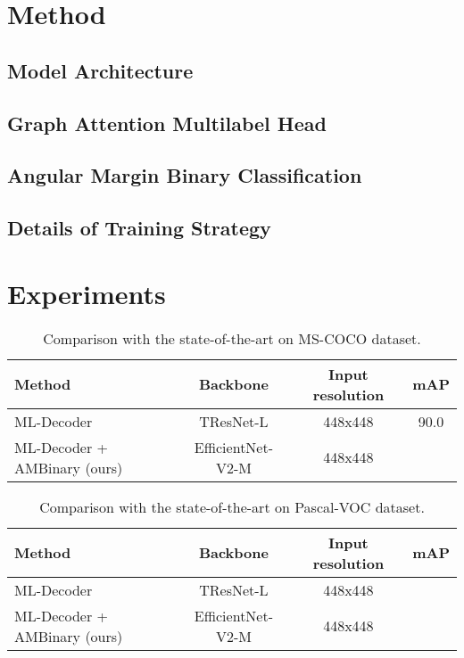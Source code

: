 \documentclass[runningheads]{llncs}
\begin{document}
\section{Method}

\subsection{Model Architecture}

\subsection{Graph Attention Multilabel Head}

\subsection{Angular Margin Binary Classification}

\subsection{Details of Training Strategy}

\section{Experiments}

\begin{table}
  \caption{Comparison with the state-of-the-art on MS-COCO dataset.}
  \label{tab:results_coco}
  \centering
  \begin{tabular}{l|c|c|c}
    Method & Backbone & Input resolution & mAP \\ \hline
    ML-Decoder & TResNet-L & 448x448 & 90.0 \\
    \hline
    ML-Decoder + AMBinary (ours) & EfficientNet-V2-M & 448x448 & \\
  \end{tabular}
\end{table}


\begin{table}
  \caption{Comparison with the state-of-the-art on Pascal-VOC dataset.}
  \label{tab:results_voc}
  \centering
  \begin{tabular}{l|c|c|c}
    Method & Backbone & Input resolution & mAP \\ \hline
    ML-Decoder & TResNet-L & 448x448 &  \\
    \hline
    ML-Decoder + AMBinary (ours) & EfficientNet-V2-M & 448x448 & \\
  \end{tabular}
\end{table}
\end{document}
